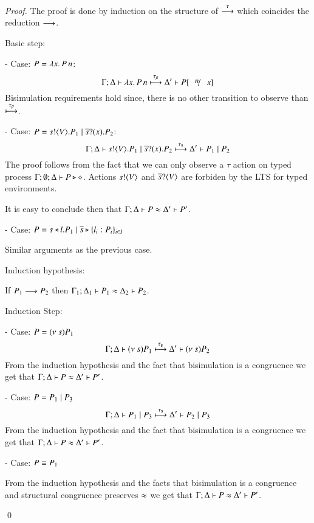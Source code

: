 \begin{proof}
	\noi The proof is done by induction on the structure of $\stackrel{\tau}{\longrightarrow}$
	which coincides the reduction $\longrightarrow$.

	\noi Basic step:

	\noi - Case: $P = \lambda x.\,P\,n$:
%
	\[
		\horel{\Gamma}{\Delta}{\appl{\abs{x}{P}}{n}}{\hby{\btau}}{\Delta'}{P \subst{n}{x}}
	\]
%
	\noi Bisimulation requirements hold since, there is no other transition to observe than ${\stackrel{\tau_{\beta}}{\longmapsto}}$.

	\noi - Case: $P = s ! \langle V \rangle . P_1 \;|\; \overline{s} ? (x) . P_2$:
%
	\[
		\Gamma; \Delta \vdash s ! \langle V \rangle . P_1 \;|\; \overline{s} ? (x) . P_2 \stackrel{\tau_{\mathsf{s}}}{\longmapsto} \Delta' \vdash P_1 \;|\; P_2
	\]
%
	\noi The proof follows from the fact that we can only observe a $\tau$
	action on typed process
	$\Gamma; \emptyset; \Delta \vdash P \triangleright \diamond$.
	Actions $s ! \langle V \rangle$ and $\overline{s} ? \langle V \rangle$
	are forbiden by the LTS for typed environments.

	\noi It is easy to conclude then that $\Gamma; \Delta \vdash P \approx \Delta' \vdash P'$.

	\noi - Case: $P = s \triangleleft l . P_1 \;|\; \overline{s} \triangleright \{l_i: P_i\}_{i \in I}$

	\noi Similar arguments as the previous case.

	\noi Induction hypothesis:

	\noi If $P_1 \longrightarrow P_2$ then $\Gamma_1; \Delta_1 \vdash P_1 \approx \Delta_2 \vdash P_2$.

	\noi Induction Step:

	\noi - Case: $P = (\nu\ s) P_1$
%
	\[
		\Gamma; \Delta \vdash (\nu\ s){P_1} \stackrel{\tau_{\mathsf{s}}}{\longmapsto} \Delta' \vdash (\nu\ s) P_2
	\]
%
	\noi From the induction hypothesis and the fact that bisimulation is a congruence
	we get that $\Gamma; \Delta \vdash P \approx \Delta' \vdash P'$.

	\noi - Case: $P = P_1 \;|\; P_3$
%
	\[
		\Gamma; \Delta \vdash P_1 \;|\; P_3 \stackrel{\tau_{\mathsf{s}}}{\longmapsto} \Delta' \vdash P_2 \;|\; P_3
	\]
%
	\noi From the induction hypothesis and the fact that bisimulation is a congruence
	we get that $\Gamma; \Delta \vdash P \approx \Delta' \vdash P'$.

	\noi - Case: $P \equiv P_1$

	From the induction hypothesis and the facts that bisimulation is a congruence
	and structural congruence preserves $\approx$
	we get that $\Gamma; \Delta \vdash P \approx \Delta' \vdash P'$.


	\qed
\end{proof}


